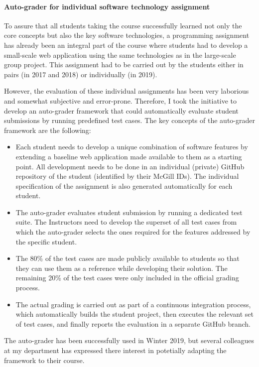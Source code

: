 \documentclass[a4paper,11pt]{article}
\begin{document}
\paragraph{Auto-grader for individual software technology assignment}
To assure that all students taking the course successfully learned not only the core concepts but also the key software technologies, a programming assignment has already been an integral part of the course where students had to develop a small-scale web application using the same technologies as in the large-scale group project. This assignment had to be carried out by the students either in pairs (in 2017 and 2018) or individually (in 2019). 

However, the evaluation of these individual assignments has been very laborious and somewhat subjective and error-prone. Therefore, I took the initiative to develop an auto-grader framework that could automatically evaluate student submissions by running predefined test cases. The key concepts of the auto-grader framework are the following:

\begin{itemize}
\item Each student needs to develop a unique combination of software features by extending a baseline web application made available to them as a starting point. All development needs to be done in an individual (private) GitHub repository of the student (identified by their McGill IDs). The individual specification of the assignment is also generated automatically for each student. 
\item The auto-grader evaluates student submission by running a dedicated test suite. The Instructors need to develop the superset of all test cases from which the auto-grader selects the ones required for the features addressed by the specific student. 
\item The 80\% of the test cases are made publicly available to students so that they can use them as a reference while developing their solution. The remaining 20\% of the test cases were only included in the official grading process. 
\item The actual grading is carried out as part of a continuous integration process, which automatically builds the student project, then executes the relevant set of test cases, and finally reports the evaluation in a separate GitHub branch.
\end{itemize}

The auto-grader has been successfully used in Winter 2019, but several colleagues at my department has expressed there interest in potetially adapting the framework to their course. 
\end{document}

